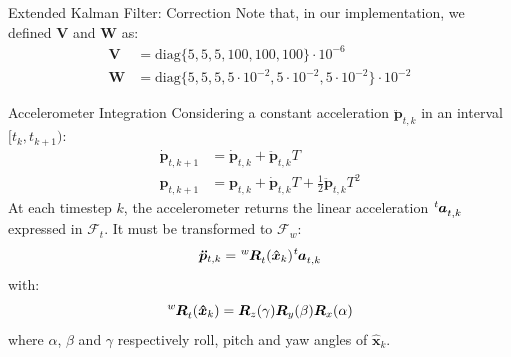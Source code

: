 \documentclass[10pt]{beamer}
\begin{document}
    \begin{frame}{Extended Kalman Filter: Correction}
        Note that, in our implementation, we defined $\bm{V}$ and $\bm{W}$ as:
        \begin{align*}
            \bm{V} &= \text{diag}\{5, 5, 5, 100, 100, 100 \} \cdot 10^{-6} \\
            \bm{W} &= \text{diag}\{5, 5, 5, 5 \cdot 10^{-2}, 5 \cdot 10^{-2}, 5 \cdot 10^{-2} \}  \cdot 10^{-2}
        \end{align*}
    \end{frame}

    \begin{frame}{Accelerometer Integration}
        Considering a constant acceleration $\bm{\ddot{p}}_{t, k}$ in an
        interval $[t_k, t_{k+1})$:
        \begin{align*}
            \bm{\dot{p}}_{t, k+1} &= \bm{\dot{p}}_{t, k} + \bm{\ddot{p}}_{t, k} T \\
            \bm{p}_{t, k+1} &= \bm{p}_{t, k} + \bm{\dot{p}}_{t, k} T + \frac{1}{2} \bm{\ddot{p}}_{t, k} T^2
        \end{align*}
        At each timestep $k$, the accelerometer returns the linear acceleration
        $\tensor[^t]{\bm{a}}{_{t,k}}$ expressed in $\mathcal{F}_t$.
        It must be transformed to $\mathcal{F}_w$:
        \begin{equation*}
            \bm{\ddot{p}}_{t,k} = \tensor[^w]{\bm{R}}{_t}(\bm{\hat{x}}_{k}) \tensor[^t]{\bm{a}}{_{t,k}}
        \end{equation*}
        with:
        \begin{equation*}
            \tensor[^w]{\bm{R}}{_t}(\bm{\hat{x}}_{k}) = \bm{R}_z(\gamma) \bm{R}_y(\beta) \bm{R}_x(\alpha)
        \end{equation*}
        where $\alpha$, $\beta$ and $\gamma$ respectively
        roll, pitch and yaw angles of $\bm{\hat{x}}_{k}$.
    \end{frame}
\end{document}
